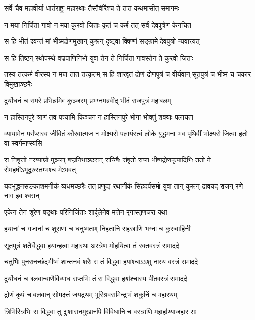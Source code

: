 \twolineshloka
{सर्वे चैव महावीर्या धार्तराष्ट्रा महारथाः}
{तैस्तैर्वीरैश्च ते तात कथमासीत् समागमः}




\twolineshloka
{न मया निर्जिता गावो न मया कुरवो जिताः}
{कृतं च कर्म तत् सर्वं देवपुत्रेण केनचित्}


\twolineshloka
{स हि भीतं द्रवन्तं मां भीष्मद्रोणमुखान् कुरून्}
{दृष्ट्वा विषण्णं सङ्ग्रामे देवपुत्रो न्यवारयत्}


\twolineshloka
{स हि तिष्ठन् रथोपस्थे वज्रपाणिनिभो युवा}
{तेन ते निर्जिता गावस्तेन ते कुरवो जिताः}


\threelineshloka
{तस्य तत्कर्म वीरस्य न मया तात तत्कृतम्}
{स हि शारद्वतं द्रोणं द्रोणपुत्रं च वीर्यवान्}
{सूतपुत्रं च भीष्मं च चकार विमुखाञ्छरैः}


\twolineshloka
{दुर्योधनं च समरे प्रभिन्नमिव कुञ्जरम्}
{प्रभग्नमब्रवीद् भीतं राजपुत्रं महाबलम्}


\twolineshloka
{न हास्तिनपुरे त्राणं तव पश्यामि किञ्चन}
{न हास्तिनपुरे भोगा भोक्तुं शक्याः पलायता}


\threelineshloka
{व्यायामेन परीप्सस्व जीवितं कौरवात्मज}
{न मोक्ष्यसे पलायंस्त्वं लोके युद्धमना भव}
{पृथिवीं भोक्ष्यसे जित्वा हतो वा स्वर्गमाप्स्यसि}


\threelineshloka
{स निवृत्तो नरव्याघ्रो मुञ्चन् वज्रनिभाञ्छरान्}
{सचिवैः संवृतो राजा भीष्मद्रोणकृपादिभिः}
{ततो मे रोमहर्षोऽभूदूरुस्तम्भश्च मेऽभवत्}


\threelineshloka
{यदभूद्धनसङ्काशमनीकं व्यधमच्छरैः}
{तत् प्रणुद्य रथानीकं सिंहदर्पसमो युवा}
{तान् कुरून् द्रावयद् राजन् रणे नाग इव श्वसन्}


\twolineshloka
{एकेन तेन शूरेण षड्रथाः परिनिर्जिताः}
{शार्दूलेनेव मत्तेन मृगास्तृणचरा यथा}


\twolineshloka
{हयानां च गजानां च शूराणां च धनुष्मताम्}
{निहतानि सहस्राणि भग्ना च कुरुवाहिनी}


\twolineshloka
{सूतपुत्रं शतैर्विद्ध्वा हयान्हत्वा महारथः}
{अस्त्रेण मोहयित्वा तं रक्तवस्त्रं समाददे}


\twolineshloka
{चतुर्भिः पुनरानर्च्छद्भीष्मं शान्तनवं शरैः}
{स तं विद्ध्वा हयांश्चाऽऽशु नास्य वस्त्रं समाददे}


\twolineshloka
{दुर्योधनं च बलवान्बाणैर्विव्याध सप्तभिः}
{तं स विद्ध्वा हयांश्चास्य पीतवस्त्रं समाददे}


\twolineshloka
{द्रोणं कृपं च बलवान् सोमदत्तं जयद्रथम्}
{भूरिश्रवसमिन्द्राभं शकुनिं च महारथम्}


\twolineshloka
{त्रिभिस्त्रिभिः स विद्ध्वा तु दुःशासनमुखानपि}
{विविधानि च वस्त्राणि महार्हाण्याजहार सः}


